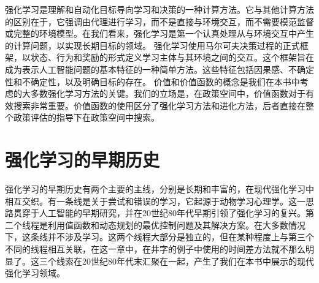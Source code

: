 强化学习是理解和自动化目标导向学习和决策的一种计算方法。它与其他计算方法的区别在于，它强调由代理进行学习，而不是直接与环境交互，而不需要模范监督或完整的环境模型。在我们看来，强化学习是第一个认真处理从与环境交互中产生的计算问题，以实现长期目标的领域。
强化学习使用马尔可夫决策过程的正式框架，以状态、行为和奖励的形式定义学习主体与其环境之间的交互。这个框架旨在成为表示人工智能问题的基本特征的一种简单方法。这些特征包括因果感、不确定性和不确定性，以及明确目标的存在。
价值和价值函数的概念是我们在本书中考虑的大多数强化学习方法的关键。我们的立场是，在政策空间中，价值函数对于有效搜索非常重要。价值函数的使用区分了强化学习方法和进化方法，后者直接在整个政策评估的指导下在政策空间中搜索。

\section{强化学习的早期历史}

强化学习的早期历史有两个主要的主线，分别是长期和丰富的，在现代强化学习中相互交织。有一条线是关于尝试和错误的学习，它起源于动物学习心理学。这一思路贯穿于人工智能的早期研究，并在20世纪80年代早期引领了强化学习的复兴。第二个线程是利用值函数和动态规划的最优控制问题及其解决方案。在大多数情况下，这条线并不涉及学习。这两个线程大部分是独立的，但在某种程度上与第三个不同的线程相互关联，在这一章中，在井字的例子中使用的时间差方法就不那么明显了。这三个线索在20世纪80年代末汇聚在一起，产生了我们在本书中展示的现代强化学习领域。

